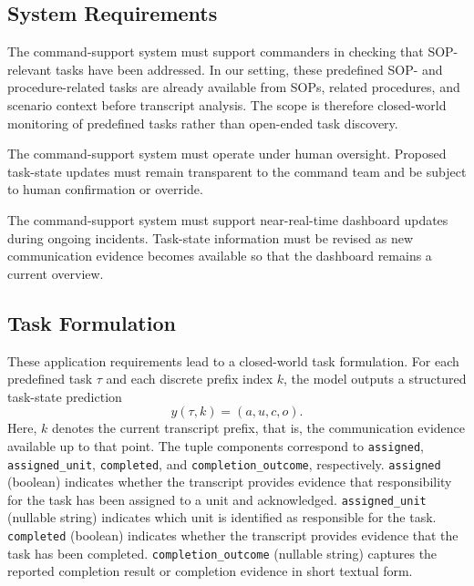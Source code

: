 \subsection{System Requirements}

The command-support system must support commanders in checking that SOP-relevant tasks have been addressed. In our setting, these predefined SOP- and procedure-related tasks are already available from SOPs, related procedures, and scenario context before transcript analysis. The scope is therefore closed-world monitoring of predefined tasks rather than open-ended task discovery.

The command-support system must operate under human oversight. Proposed task-state updates must remain transparent to the command team and be subject to human confirmation or override.

The command-support system must support near-real-time dashboard updates during ongoing incidents. Task-state information must be revised as new communication evidence becomes available so that the dashboard remains a current overview.

\subsection{Task Formulation}

These application requirements lead to a closed-world task formulation. For each predefined task $\tau$ and each discrete prefix index $k$, the model outputs a structured task-state prediction
\[
y(\tau, k) = (a, u, c, o).
\]
Here, $k$ denotes the current transcript prefix, that is, the communication evidence available up to that point. The tuple components correspond to \texttt{assigned}, \texttt{assigned\_unit}, \texttt{completed}, and \texttt{completion\_outcome}, respectively. \texttt{assigned} (boolean) indicates whether the transcript provides evidence that responsibility for the task has been assigned to a unit and acknowledged. \texttt{assigned\_unit} (nullable string) indicates which unit is identified as responsible for the task. \texttt{completed} (boolean) indicates whether the transcript provides evidence that the task has been completed. \texttt{completion\_outcome} (nullable string) captures the reported completion result or completion evidence in short textual form.
